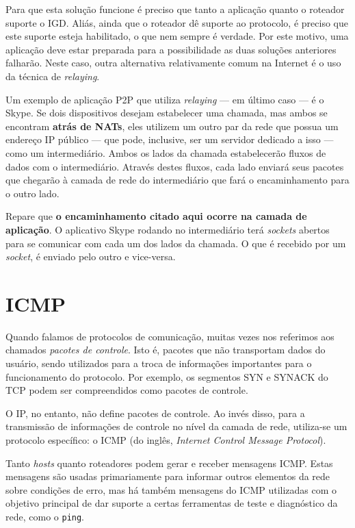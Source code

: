 \documentclass{article}
\begin{document}
Para que esta solução funcione é preciso que tanto a aplicação quanto o roteador suporte o IGD. Aliás, ainda que o roteador dê suporte ao protocolo, é preciso que este suporte esteja habilitado, o que nem sempre é verdade. Por este motivo, uma aplicação deve estar preparada para a possibilidade as duas soluções anteriores falharão. Neste caso, outra alternativa relativamente comum na Internet é o uso da técnica de \textit{relaying}.

Um exemplo de aplicação P2P que utiliza \textit{relaying} --- em último caso --- é o Skype. Se dois dispositivos desejam estabelecer uma chamada, mas ambos se encontram \textbf{atrás de NATs}, eles utilizem um outro par da rede que possua um endereço IP público --- que pode, inclusive, ser um servidor dedicado a isso --- como um intermediário. Ambos os lados da chamada estabelecerão fluxos de dados com o intermediário. Através destes fluxos, cada lado enviará seus pacotes que chegarão à camada de rede do intermediário que fará o encaminhamento para o outro lado.

Repare que \textbf{o encaminhamento citado aqui ocorre na camada de aplicação}. O aplicativo Skype rodando no intermediário terá \textit{sockets} abertos para se comunicar com cada um dos lados da chamada. O que é recebido por um \textit{socket}, é enviado pelo outro e vice-versa.

\section{ICMP}

Quando falamos de protocolos de comunicação, muitas vezes nos referimos aos chamados \textit{pacotes de controle}. Isto é, pacotes que não transportam dados do usuário, sendo utilizados para a troca de informações importantes para o funcionamento do protocolo. Por exemplo, os segmentos SYN e SYNACK do TCP podem ser compreendidos como pacotes de controle.

O IP, no entanto, não define pacotes de controle. Ao invés disso, para a transmissão de informações de controle no nível da camada de rede, utiliza-se um protocolo específico: o ICMP (do inglês, \textit{Internet Control Message Protocol}). 

Tanto \textit{hosts} quanto roteadores podem gerar e receber mensagens ICMP. Estas mensagens são usadas primariamente para informar outros elementos da rede sobre condições de erro, mas há também mensagens do ICMP utilizadas com o objetivo principal de dar suporte a certas ferramentas de teste e diagnóstico da rede, como o \texttt{ping}.
\end{document}
